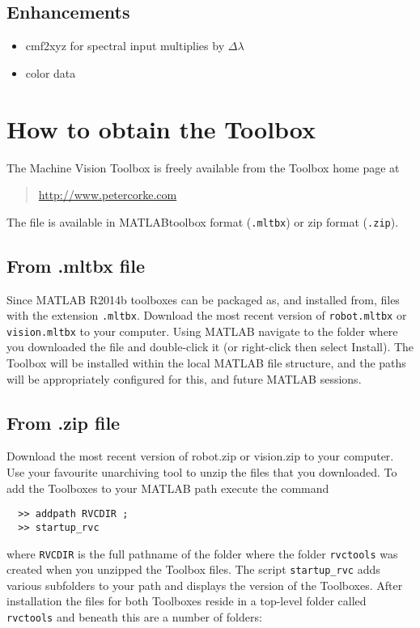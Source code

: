 \documentclass[a4paper,twoside]{report}
\def\Mlab{MATLAB}
\begin{document}
\subsection{Enhancements}
\begin{itemize}
\item cmf2xyz for spectral input multiplies by $\Delta \lambda$
\item color data
\end{itemize}

\section{How to obtain the Toolbox}
The Machine Vision Toolbox is freely available from the Toolbox home
page at 
\begin{quote}
\url{http://www.petercorke.com}
\end{quote}


The file is available in \Mlab toolbox format (\texttt{.mltbx}) or zip format (\texttt{.zip}). 

\subsection{From .mltbx file}
Since MATLAB R2014b toolboxes can be packaged as, and installed from, files with the extension \texttt{.mltbx}. Download the most recent version of \texttt{robot.mltbx} or \texttt{vision.mltbx} to your computer. Using MATLAB navigate to the folder where you downloaded the file and double-click it (or right-click then select Install). The Toolbox will be installed within the local MATLAB file structure, and the paths will be appropriately configured for this, and future MATLAB sessions.

\subsection{From .zip file}
Download the most recent version of robot.zip or vision.zip to your computer. Use your favourite unarchiving tool to unzip the files that you downloaded.
To add the Toolboxes to your MATLAB path execute the command
\begin{verbatim}
  >> addpath RVCDIR ;
  >> startup_rvc
\end{verbatim}
where \texttt{RVCDIR} is the full pathname of the folder where the folder \texttt{rvctools} was created when you unzipped the Toolbox files. The script \texttt{startup\_rvc} adds various subfolders to your path and displays the version of the Toolboxes.
After installation the files for both Toolboxes reside in a top-level folder called \texttt{rvctools} and beneath this are a number of folders:
\end{document}
